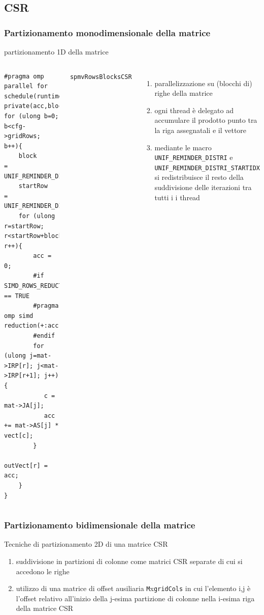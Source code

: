\documentclass[aspectratio=1610]{beamer}
\newcommand{\vvv}[1]{{\small\texttt{#1}}}
\begin{document}
\subsection{CSR}
\subsubsection{Partizionamento monodimensionale della matrice}
\begin{frame}[fragile]	{partizionamento 1D della matrice} 
	\begin{columns}

\begin{lstlisting}[xleftmargin=\dimexpr-\csname @totalleftmargin\endcsname]
#pragma omp parallel for schedule(runtime) private(acc,block,startRow,c)
for (ulong b=0;   b<cfg->gridRows;   b++){
    block      = UNIF_REMINDER_DISTRI(b,rowBlock,rowBlockRem);
    startRow   = UNIF_REMINDER_DISTRI_STARTIDX(b,rowBlock,rowBlockRem);
    for (ulong r=startRow;  r<startRow+block;  r++){
        acc = 0;
        #if SIMD_ROWS_REDUCTION == TRUE
        #pragma omp simd reduction(+:acc)
        #endif
        for (ulong j=mat->IRP[r]; j<mat->IRP[r+1]; j++){
           c = mat->JA[j];
           acc += mat->AS[j] * vect[c];
        }
        outVect[r] = acc;
    } 
}
\end{lstlisting}
			
			\vvv{spmvRowsBlocksCSR}
			\begin{enumerate}
				\item parallelizzazione su (blocchi di) righe della matrice
				\item ogni thread è delegato ad accumulare il prodotto punto
						tra la riga assegnatali e il vettore
				\item mediante le macro \vvv{UNIF\_REMINDER\_DISTRI} e \vvv{UNIF\_REMINDER\_DISTRI\_STARTIDX}
					si redistribuisce il resto della suddivisione delle iterazioni tra tutti i i thread
			\end{enumerate}
	\end{columns}
\end{frame}

\subsubsection{Partizionamento bidimensionale della matrice}
\begin{frame}{Tecniche di partizionamento 2D di una matrice CSR}
	\begin{enumerate}
		\item 	suddivisione in partizioni di colonne come matrici CSR separate
				di cui si accedono le righe
		\pause
		\item 	utilizzo di una matrice di offset ausiliaria \vvv{M}x\vvv{gridCols}
		\pause
				in cui l'elemento i,j è l'offset relativo all'inizio della j-esima partizione di
				colonne nella i-esima riga della matrice CSR
	\end{enumerate}
\end{frame}
\end{document}
